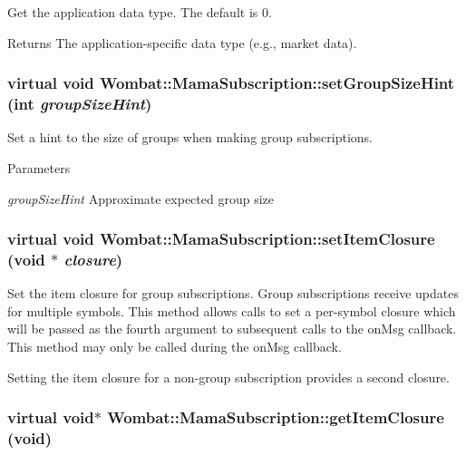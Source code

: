 Get the application data type. The default is 0.

\begin{DoxyReturn}{Returns}
The application-\/specific data type (e.g., market data). 
\end{DoxyReturn}
\hypertarget{classWombat_1_1MamaSubscription_a3067981d0bddb17f0616c5afa809da21}{
\subsubsection[{setGroupSizeHint}]{\setlength{\rightskip}{0pt plus 5cm}virtual void Wombat::MamaSubscription::setGroupSizeHint (int {\em groupSizeHint})}}
\label{classWombat_1_1MamaSubscription_a3067981d0bddb17f0616c5afa809da21}


Set a hint to the size of groups when making group subscriptions. 
\begin{DoxyParams}{Parameters}
\item[{\em groupSizeHint}]Approximate expected group size \end{DoxyParams}
\hypertarget{classWombat_1_1MamaSubscription_a5d25d46a51905fffaba2d7b5c0fdb65c}{
\subsubsection[{setItemClosure}]{\setlength{\rightskip}{0pt plus 5cm}virtual void Wombat::MamaSubscription::setItemClosure (void $\ast$ {\em closure})}}
\label{classWombat_1_1MamaSubscription_a5d25d46a51905fffaba2d7b5c0fdb65c}


Set the item closure for group subscriptions. Group subscriptions receive updates for multiple symbols. This method allows calls to set a per-\/symbol closure which will be passed as the fourth argument to subsequent calls to the onMsg callback. This method may only be called during the onMsg callback.

Setting the item closure for a non-\/group subscription provides a second closure. \hypertarget{classWombat_1_1MamaSubscription_a24e2f328324ade72834cb96fe445bc24}{
\subsubsection[{getItemClosure}]{\setlength{\rightskip}{0pt plus 5cm}virtual void$\ast$ Wombat::MamaSubscription::getItemClosure (void)}}
\label{classWombat_1_1MamaSubscription_a24e2f328324ade72834cb96fe445bc24}


